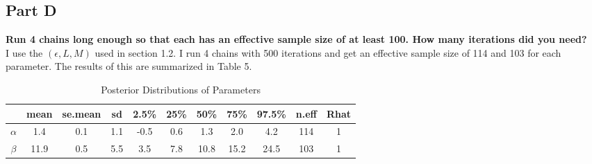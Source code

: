 \documentclass{article}
\begin{document}
\subsection{Part D}
\textbf{Run 4 chains long enough so that each has an effective sample size of at least 100. How many iterations did you need?}\\
I use the $(\epsilon, L, M)$ used in section 1.2. I run 4 chains with 500 iterations and get an effective sample size of 114 and 103 for each parameter. The results of this are summarized in Table 5.
\begin{table} [H]
\caption {Posterior Distributions of Parameters}
\vspace{2mm}
\def\arraystretch{1.5}
\centering \begin{tabular}{c c c c c c c c c c c} 
\hline\hline 
\vspace{1mm}
 & mean & se.mean  &  sd   & 2.5\%  &  25\% &   50\% &   75\% & 97.5\% & n.eff & Rhat \\  [0.5ex] \hline
$\alpha$   &   	1.4  &   0.1 &1.1& -0.5 &0.6 & 1.3 & 2.0 &  4.2  & 114  &  1\\
$\beta$    &   	11.9  &   0.5 &5.5 & 3.5 &7.8 &10.8 &15.2&  24.5 &  103 &   1
 \\
\hline 
\end{tabular}
\end{table}
\end{document}
